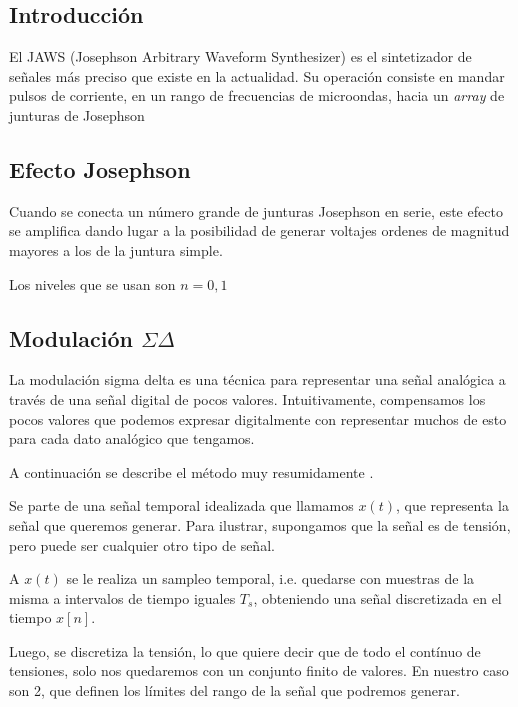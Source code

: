 \documentclass[twoside]{article}
\begin{document}
\begin{multicols}{2}

\section{Introducción}

El JAWS (Josephson Arbitrary Waveform Synthesizer) es el sintetizador de señales  más preciso que existe en la actualidad. Su operación consiste en mandar pulsos de corriente, en un rango de frecuencias de microondas, hacia un {\it array} de junturas de Josephson

\subsection{Efecto Josephson}

Cuando se conecta un número grande de junturas Josephson en serie, este efecto se amplifica dando lugar a la posibilidad de generar voltajes ordenes de magnitud mayores a los de la juntura simple. 

Los niveles que se usan son $n=0,1$


\subsection{Modulación $\Sigma\Delta$}

La modulación sigma delta es una técnica para representar una señal analógica a través de una señal digital de pocos valores. Intuitivamente, compensamos los pocos valores que podemos expresar digitalmente con representar muchos de esto para cada dato analógico que tengamos.

A continuación se describe el método muy resumidamente \cite{delarosa2011}. 


Se parte de una señal temporal idealizada que llamamos $x(t)$, que representa la señal que queremos generar. Para ilustrar, supongamos que la señal es de tensión, pero puede ser cualquier otro tipo de señal.

A $x(t)$ se le realiza un sampleo temporal, i.e. quedarse con muestras de la misma a intervalos de tiempo iguales $T_s$, obteniendo una señal discretizada en el tiempo $x[n]$.

Luego, se discretiza la tensión, lo que quiere decir que de todo el contínuo de tensiones, solo nos quedaremos con un conjunto finito de valores. En nuestro caso son 2, que definen los límites del rango de la señal que podremos generar.



\end{multicols}
\end{document}
